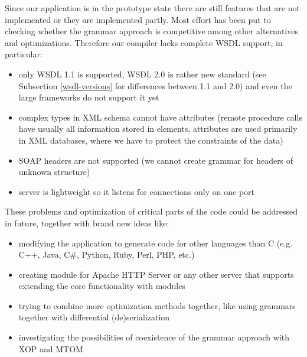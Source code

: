 \documentclass[12pt,notitlepage]{report}
\begin{document}
Since our application is in the prototype state there are still features that are not implemented or they are implemented partly. Most effort has been put to checking whether the grammar approach is competitive among other alternatives and optimizations. Therefore our compiler lacks complete WSDL support, in particular:
\begin{itemize}
 \item only WSDL 1.1 is supported, WSDL 2.0 is rather new standard (see Subsection \ref{wsdl-versions} for differences between 1.1 and 2.0) and even the large frameworks do not support it yet
 \item complex types in XML schema cannot have attributes (remote procedure calls have usually all information stored in elements, attributes are used primarily in XML databases, where we have to protect the constraints of the data)
 \item SOAP headers are not supported (we cannot create grammar for headers of unknown structure)
 \item server is lightweight so it listens for connections only on one port
\end{itemize}
These problems and optimization of critical parts of the code could be addressed in future, together with brand new ideas like:
\begin{itemize}
 \item modifying the application to generate code for other languages than C (e.g. C++, Java, C\#, Python, Ruby, Perl, PHP, etc.)
 \item creating module for Apache HTTP Server or any other server that supports extending the core functionality with modules
 \item trying to combine more optimization methods together, like using grammars together with differential (de)serialization
 \item investigating the possibilities of coexistence of the grammar approach with XOP\cite{w3c-xop} and MTOM\cite{w3c-mtom}
\end{itemize}
\end{document}
